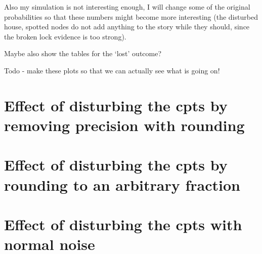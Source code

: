 \documentclass[11pt]{amsart}
\begin{document}
Also my simulation is not interesting enough, I will change some of the original probabilities so that these numbers might become more interesting (the disturbed house, spotted nodes do not add anything to the story while they should, since the broken lock evidence is too strong).

Maybe also show the tables for the `lost' outcome?

Todo - make these plots so that we can actually see what is going on!

\clearpage

\section{Effect of disturbing the cpts by removing precision with rounding}
\let\oldcentering\centering
\renewcommand\centering{\tiny\oldcentering}


\clearpage
\section{Effect of disturbing the cpts by rounding to an arbitrary fraction}

\clearpage
\section{Effect of disturbing the cpts with normal noise}

\clearpage
\end{document}
